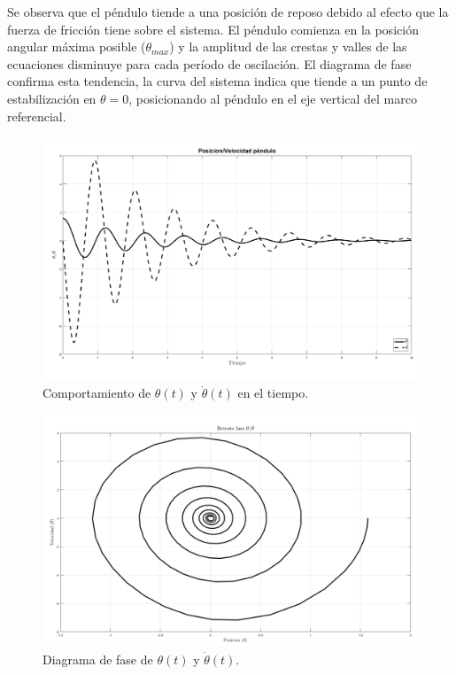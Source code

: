 Se observa que el péndulo tiende a una posición de reposo debido
al efecto que la fuerza de fricción tiene sobre el sistema.
El péndulo comienza en la posición angular máxima posible 
($\theta_{max}$) y la amplitud de las crestas y valles de las 
ecuaciones disminuye para cada período de oscilación.
El diagrama de fase confirma esta tendencia, la curva del sistema
indica que tiende a un punto de estabilización en $\theta = 0$,
posicionando al péndulo en el eje vertical del marco referencial.

\begin{figure}[hb]
 \centering 
 \includegraphics[scale=0.3]{./img/PosVelF.png}
 \caption{Comportamiento de $\theta(t)$ y $\dot{\theta}(t)$ en el tiempo.}
 \label{fig: time plot theta dtheta friction}
\end{figure}

\begin{figure}[hb]
 \centering 
 \includegraphics[scale=0.3]{./img/faseF.png}
\caption{Diagrama de fase de $\theta(t)$ y $\dot{\theta}(t)$.}
 \label{fig: phase plot theta friction}
\end{figure}
